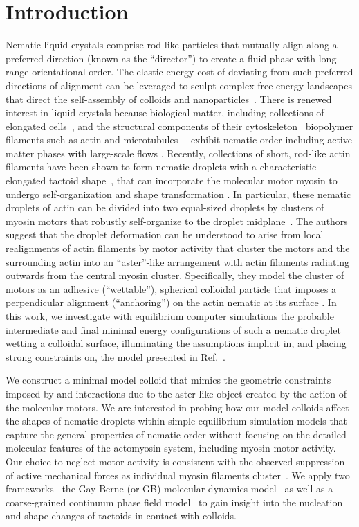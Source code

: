 \documentclass[%
 aip,
 amsmath,amssymb,
 reprint,%
]{revtex4-1}
\begin{document}
\section{Introduction} \label{sec:tactoidIntro}
Nematic liquid crystals comprise rod-like particles that mutually align along a preferred direction (known as the ``director'') to create a fluid phase with long-range orientational order. The elastic energy cost of deviating from such preferred directions of alignment can be leveraged to sculpt complex free energy landscapes that direct the self-assembly of colloids and nanoparticles~\cite{Smalyukh18}. There is renewed interest in liquid crystals because biological matter, including collections of elongated cells~\cite{Saw2017, Hirst2017}, and the structural components of their cytoskeleton \textendash\, biopolymer filaments such as actin and microtubules~\cite{Sanchez2012, Kumar2018} \textendash\, exhibit nematic order including active matter phases with large-scale flows \cite{Doostmohammadi2018}. Recently, collections of short, rod-like actin filaments have been shown to form nematic droplets with a characteristic elongated tactoid shape~\cite{Weirich17}, that can incorporate the molecular motor myosin to undergo self-organization and shape transformation \cite{Weirich19}. In particular, these nematic droplets of actin can be divided into two equal-sized droplets by clusters of myosin motors that robustly self-organize to the droplet midplane~\cite{Weirich19}. The authors suggest that the droplet deformation can be understood to arise from local realignments of actin filaments by motor activity that cluster the motors and the surrounding actin into an ``aster''-like arrangement \cite{SoareseSilva2011} with actin filaments radiating outwards from the central myosin cluster. Specifically, they model the cluster of motors as an adhesive (``wettable''), spherical colloidal particle that imposes a perpendicular alignment (``anchoring'') on the actin nematic at its surface \cite{DeGennesText}. In this work, we investigate with equilibrium computer simulations the probable intermediate and final minimal energy configurations of such a nematic droplet wetting a colloidal surface, illuminating the assumptions implicit in, and placing strong constraints on, the model presented in Ref.~.

We construct a minimal model colloid that mimics the geometric constraints imposed by and interactions due to the aster-like object created by the action of the molecular motors. We are interested in probing how our model colloids affect the shapes of nematic droplets within simple equilibrium simulation models that capture the general properties of nematic order without focusing on the detailed molecular features of the actomyosin system, including myosin motor activity. Our choice to neglect motor activity is consistent with the observed suppression of active mechanical forces as individual myosin filaments cluster~\cite{Kumar2018}.  We apply two frameworks \textendash\, the Gay-Berne (or GB) molecular dynamics model~\cite{GayBerne} as well as a coarse-grained continuum phase field model \textendash\, to gain insight into the nucleation and shape changes of tactoids in contact with colloids. 
\end{document}
